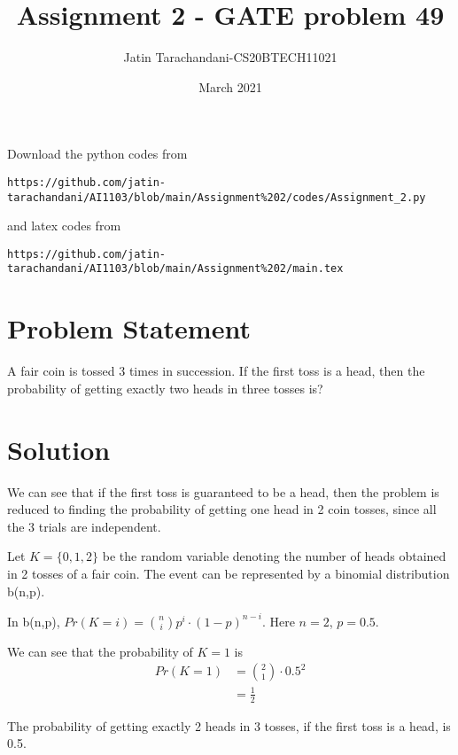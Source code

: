 \documentclass[twocolumn]{article}
\title{Assignment 2 - GATE problem 49}
\author{Jatin Tarachandani-CS20BTECH11021}
\date{March 2021}
\providecommand{\brak}[1]{\ensuremath{\left(#1\right)}}
\begin{document}
\maketitle
Download the python codes from 
\begin{lstlisting}
https://github.com/jatin-tarachandani/AI1103/blob/main/Assignment%202/codes/Assignment_2.py
\end{lstlisting}
%
and latex codes from 
%
\begin{lstlisting}
https://github.com/jatin-tarachandani/AI1103/blob/main/Assignment%202/main.tex
\end{lstlisting}
\section{Problem Statement}
A fair coin is tossed 3 times in succession. If the first toss is a head, then the probability of getting exactly two heads in three tosses is?
\section{Solution}
We can see that if the first toss is guaranteed to be a head, then the problem is reduced to finding the probability of getting one head in 2 coin tosses, since all the 3 trials are independent.

Let $K=\{0, 1, 2\}$ be the random variable denoting the number of heads obtained in 2 tosses of a fair coin. The event can be represented by a binomial distribution b(n,p).

In b(n,p), $Pr\brak{K=i}= \binom{n}{i}p^i \cdot (1-p)^{n-i}$. Here $n=2$, $p=0.5$.

 We can see that the probability of $K=1$ is 
 \begin{align*}
 Pr\brak{K=1}&=\binom{2}{1} \cdot 0.5^2\\
 &=\frac{1}{2}
 \end{align*}
 
The probability of getting exactly 2 heads in 3 tosses, if the first toss is a head, is 0.5.
\end{document}
